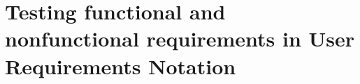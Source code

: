 \chapter{Testing functional and nonfunctional requirements in User Requirements Notation}\label{sec:topic_8}
